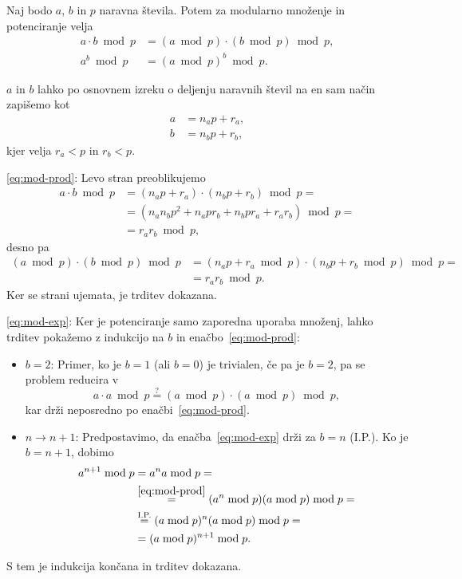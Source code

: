 \documentclass[isrm2, tisk]{fmfdelo}
\begin{document}
\begin{trditev}
\label{trd:mod-mn-pt}
    Naj bodo $a$, $b$ in $p$ naravna števila. Potem za modularno množenje in potenciranje velja
    \begin{align}
        a \cdot b \bmod p &= (a \bmod p) \cdot (b \bmod p) \bmod p, \label{eq:mod-prod} \\
        a^b \bmod p &= (a \bmod p)^b \bmod p. \label{eq:mod-exp} 
    \end{align}
\end{trditev}
\begin{dokaz}
    $a$ in $b$ lahko po osnovnem izreku o deljenju naravnih števil na en sam način zapišemo kot 
    \begin{align*}
        a &= n_a p + r_a, \\
        b &= n_b p + r_b,
    \end{align*}
    kjer velja $r_a < p$ in $r_b < p$.

    \eqref{eq:mod-prod}: Levo stran preoblikujemo
    \begin{align*}
        a \cdot b \bmod p &= (n_a p + r_a) \cdot (n_b p + r_b) \bmod p = \\
                          &= (n_a n_b p^2 + n_a p r_b + n_b p r_a + r_a r_b) \bmod p = \\
                          &= r_a r_b \bmod p,
    \end{align*}
    desno pa
    \begin{align*}
        (a \bmod p) \cdot (b \bmod p) \bmod p &= (n_a p + r_a \bmod p) \cdot (n_b p + r_b \bmod p) \bmod p = \\
                          &= r_a r_b \bmod p.
    \end{align*}
    Ker se strani ujemata, je trditev dokazana.

    \eqref{eq:mod-exp}: Ker je potenciranje samo zaporedna uporaba množenj, lahko trditev pokažemo z 
    indukcijo na $b$ in enačbo~\eqref{eq:mod-prod}:
    \begin{itemize}
        \item $b = 2$: Primer, ko je $b = 1$ (ali $b = 0$) je trivialen, če pa je $b = 2$, pa se 
            problem reducira v 
            $$ 
            a \cdot a \bmod p \stackrel{?}{=} (a \bmod p) \cdot (a \bmod p) \bmod p,
            $$
            kar drži neposredno po enačbi~\eqref{eq:mod-prod}.
        \item $n \rightarrow n + 1$: Predpostavimo, da enačba~\eqref{eq:mod-exp} drži za $b = n$ (I.P.). 
            Ko je $b = n + 1$, dobimo 
            \begin{align*}
                a^{n + 1} \bmod p &= a^n a \bmod p = \\ 
                                  &\stackrel{\eqref{eq:mod-prod}}{=} (a^n \bmod p) (a \bmod p) \bmod p = \\
                                  &\stackrel{\text{I.P.}}{=} (a \bmod p)^n (a \bmod p) \bmod p = \\
                                  &= (a \bmod p)^{n + 1} \bmod p.
            \end{align*}
    \end{itemize}
    S tem je indukcija končana in trditev dokazana.
\end{dokaz}
\end{document}
